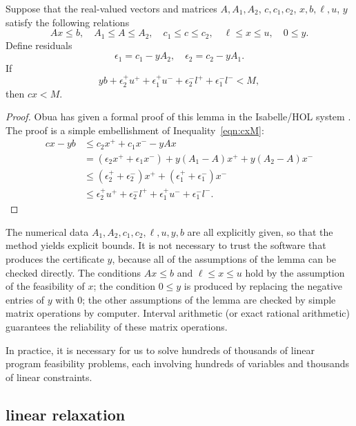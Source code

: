 \begin{lemma}  Suppose that the real-valued vectors and matrices
$A,A_1,A_2$, $c,c_1,c_2$, $x,b,\ell,u$, $y$ satisfy the following
relations
  \[ 
  A x\le b, \quad A_1 \le A \le A_2,
  \quad c_1 \le c \le c_2,\quad \ell\le x\le u,\quad
  0\le y.
  \]
Define residuals
  \[ 
   \epsilon_1 = c_1 - y A_2,\quad \epsilon_2 = c_2  - y A_1.
  \]
If
\[ 
y b + \epsilon_2^+ u^+ + \epsilon_1^+ u^- + \epsilon_2^- l^+ + \epsilon_1^- l^- < M,
\]
then $c x < M$.
\end{lemma}

\begin{proof} Obua has given a formal proof of this lemma in the
Isabelle/HOL system \cite[3.7.2]{Obua:2008:Thesis}.  The proof
is a simple embellishment of Inequality~\ref{eqn:cxM}:
\begin{align*}
c x -y b &\le c_2 x^+ + c_1 x^- -y A x\\
              &= (\epsilon_2 x^+ + \epsilon_1 x^-)
  + y (A_1-A) x^+ + y (A_2 - A) x^- \\
              &\le (\epsilon_2^+ +\epsilon_2^-) x^+ 
       + (\epsilon_1^++\epsilon_1^-) x^-\\
              &\le \epsilon_2^+ u^+ +  \epsilon_2^- l^+ 
           + \epsilon_1^+ u^- + \epsilon_1^- l^-.
\end{align*}
\end{proof}

The numerical data $A_1,A_2,c_1,c_2,\ell,u,y,b$ are all explicitly given,
so that the method yields explicit bounds.
It is not necessary to trust the software
that produces the certificate $y$, because
all of the assumptions of the lemma can be checked directly.
The conditions $A x \le b$ and $\ell\le x\le u$ hold by the assumption
of the feasibility of $x$; the condition $0\le y$ is produced by replacing the
negative entries of $y$ with $0$; the other assumptions of the lemma are
checked by simple matrix operations by computer.  Interval arithmetic 
(or exact rational arithmetic) guarantees
the reliability of these matrix
operations.

In practice, it is necessary for us to solve hundreds of thousands of
linear program feasibility problems, each involving
hundreds of variables and thousands of linear constraints.

\subsection{linear relaxation}

